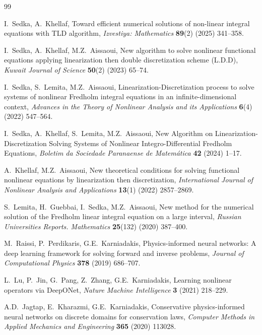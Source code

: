 \documentclass[12pt,a4paper]{article}
\begin{document}
\newpage
\begin{thebibliography}{99}

I.~Sedka, A.~Khellaf,
Toward efficient numerical solutions of non-linear integral
equations with TLD algorithm,
\textit{Izvestiya: Mathematics} \textbf{89}(2) (2025)
341--358.

I.~Sedka, A.~Khellaf, M.Z.~Aissaoui,
New algorithm to solve nonlinear functional equations
applying linearization then double discretization scheme
(L.D.D),
\textit{Kuwait Journal of Science} \textbf{50}(2) (2023)
65--74.

I.~Sedka, S.~Lemita, M.Z.~Aissaoui,
Linearization-Discretization process to solve systems of
nonlinear Fredholm integral equations in an
infinite-dimensional context,
\textit{Advances in the Theory of Nonlinear Analysis and
its Applications} \textbf{6}(4) (2022) 547--564.

I.~Sedka, A.~Khellaf, S.~Lemita, M.Z.~Aissaoui,
New Algorithm on Linearization-Discretization Solving
Systems of Nonlinear Integro-Differential Fredholm
Equations,
\textit{Boletim da Sociedade Paranaense de
Matem\'{a}tica} \textbf{42} (2024) 1--17.

A.~Khellaf, M.Z.~Aissaoui,
New theoretical conditions for solving functional
nonlinear equations by linearization then discretization,
\textit{International Journal of Nonlinear Analysis and
Applications} \textbf{13}(1) (2022) 2857--2869.

S.~Lemita, H.~Guebbai, I.~Sedka, M.Z.~Aissaoui,
New method for the numerical solution of the Fredholm
linear integral equation on a large interval,
\textit{Russian Universities Reports. Mathematics}
\textbf{25}(132) (2020) 387--400.

M.~Raissi, P.~Perdikaris, G.E.~Karniadakis,
Physics-informed neural networks: A deep learning
framework for solving forward and inverse problems,
\textit{Journal of Computational Physics}
\textbf{378} (2019) 686--707.

L.~Lu, P.~Jin, G.~Pang, Z.~Zhang, G.E.~Karniadakis,
Learning nonlinear operators via DeepONet,
\textit{Nature Machine Intelligence} \textbf{3} (2021)
218--229.

A.D.~Jagtap, E.~Kharazmi, G.E.~Karniadakis,
Conservative physics-informed neural networks on discrete
domains for conservation laws,
\textit{Computer Methods in Applied Mechanics and
Engineering} \textbf{365} (2020) 113028.


\end{thebibliography}
\end{document}
